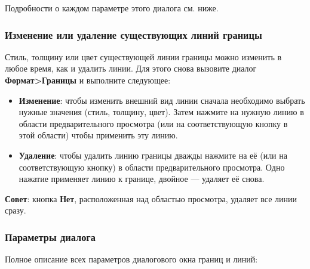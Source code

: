 \documentclass[a4paper,10pt]{article}
\begin{document}
Подробности о каждом параметре этого диалога см. ниже.

\subsubsection{Изменение или удаление существующих линий границы}
Стиль, толщину или цвет существующей линии границы можно изменить в любое время, как и удалить линии. Для этого снова вызовите диалог \textbf{Формат>Границы} и выполните следующее:
\begin{itemize}
 \item \textbf{Изменение}: чтобы изменить внешний вид линии сначала необходимо выбрать нужные значения (стиль, толщину, цвет). Затем нажмите на нужную линию в области предварительного просмотра (или на соответствующую кнопку в этой области) чтобы применить эту линию.
 \item \textbf{Удаление}: чтобы удалить линию границы дважды нажмите на её (или на соответствующую кнопку) в области предварительного просмотра. Одно нажатие применяет линию к границе, двойное — удаляет её снова.
\end{itemize}

\textbf{Совет}: кнопка \textbf{Нет}, расположенная над областью просмотра, удаляет все линии сразу.

\subsubsection{Параметры диалога}
Полное описание всех параметров диалогового окна границ и линий:
\end{document}
